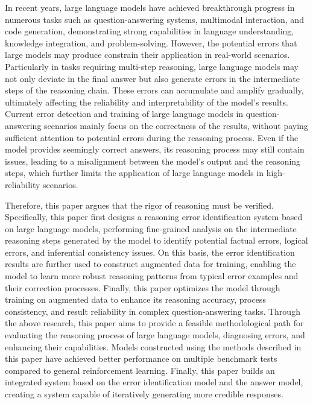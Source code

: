\begin{eabstract}
In recent years, large language models have achieved breakthrough progress in numerous tasks such as question-answering systems, multimodal interaction, and code generation, demonstrating strong capabilities in language understanding, knowledge integration, and problem-solving.
However, the potential errors that large models may produce constrain their application in real-world scenarios. Particularly in tasks requiring multi-step reasoning, large language models may not only deviate in the final answer but also generate errors in the intermediate steps of the reasoning chain. These errors can accumulate and amplify gradually, ultimately affecting the reliability and interpretability of the model's results.
Current error detection and training of large language models in question-answering scenarios mainly focus on the correctness of the results, without paying sufficient attention to potential errors during the reasoning process. Even if the model provides seemingly correct answers, its reasoning process may still contain issues, leading to a misalignment between the model's output and the reasoning steps, which further limits the application of large language models in high-reliability scenarios.

Therefore, this paper argues that the rigor of reasoning must be verified. Specifically, this paper first designs a reasoning error identification system based on large language models, performing fine-grained analysis on the intermediate reasoning steps generated by the model to identify potential factual errors, logical errors, and inferential consistency issues. On this basis, the error identification results are further used to construct augmented data for training, enabling the model to learn more robust reasoning patterns from typical error examples and their correction processes. Finally, this paper optimizes the model through training on augmented data to enhance its reasoning accuracy, process consistency, and result reliability in complex question-answering tasks.
Through the above research, this paper aims to provide a feasible methodological path for evaluating the reasoning process of large language models, diagnosing errors, and enhancing their capabilities. Models constructed using the methods described in this paper have achieved better performance on multiple benchmark tests compared to general reinforcement learning. Finally, this paper builds an integrated system based on the error identification model and the answer model, creating a system capable of iteratively generating more credible responses.
\end{eabstract}
